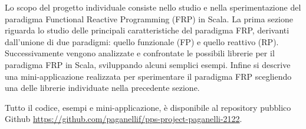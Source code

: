 \documentclass[../main.tex]{subfiles}
\begin{document}
Lo scopo del progetto individuale consiste nello studio e nella sperimentazione del paradigma Functional Reactive Programming (FRP) in Scala. La prima sezione riguarda lo studio delle principali caratteristiche del paradigma FRP, derivanti dall'unione di due paradigmi: quello funzionale (FP) e quello reattivo (RP). Successivamente vengono analizzate e confrontate le possibili librerie per il paradigma FRP in Scala, sviluppando alcuni semplici esempi. Infine si descrive una mini-applicazione realizzata per sperimentare il paradigma FRP scegliendo una delle librerie individuate nella precedente sezione.

Tutto il codice, esempi e mini-applicazione, è disponibile al repository pubblico Github \url{https://github.com/paganellif/pps-project-paganelli-2122}.
\end{document}
